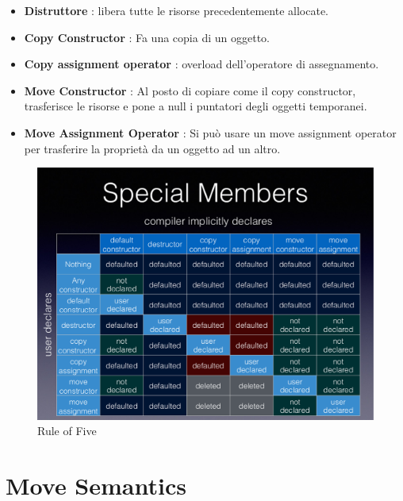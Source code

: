 \begin{itemize}
	\item \textsf{\small \textbf{Distruttore} : libera tutte le risorse precedentemente allocate.}
	\item \textsf{\small \textbf{Copy Constructor} : Fa una copia di un oggetto.}
	\item \textsf{\small \textbf{Copy assignment operator} : overload dell'operatore di assegnamento.}
	\item \textsf{\small \textbf{Move Constructor} : Al posto di copiare come il copy constructor, trasferisce le risorse e pone a null i puntatori degli oggetti temporanei.}
	\item \textsf{\small \textbf{Move Assignment Operator} : Si può usare un move assignment operator per trasferire la proprietà da un oggetto ad un altro.}
\end{itemize}

\begin{figure}[ht]
	\centering
	\includegraphics[width=1\textwidth, height=1\textheight, keepaspectratio]{./imgs/rule_of_five.png}
	\caption{Rule of Five}
	\label{fig:rule_of_five}
\end{figure}




\section{Move Semantics}

